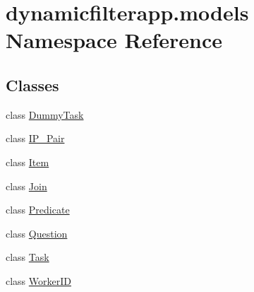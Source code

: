 \hypertarget{namespacedynamicfilterapp_1_1models}{}\section{dynamicfilterapp.\+models Namespace Reference}
\label{namespacedynamicfilterapp_1_1models}
\subsection*{Classes}
\begin{DoxyCompactItemize}
\item 
class \mbox{\hyperlink{classdynamicfilterapp_1_1models_1_1_dummy_task}{Dummy\+Task}}
\item 
class \mbox{\hyperlink{classdynamicfilterapp_1_1models_1_1_i_p___pair}{I\+P\+\_\+\+Pair}}
\item 
class \mbox{\hyperlink{classdynamicfilterapp_1_1models_1_1_item}{Item}}
\item 
class \mbox{\hyperlink{classdynamicfilterapp_1_1models_1_1_join}{Join}}
\item 
class \mbox{\hyperlink{classdynamicfilterapp_1_1models_1_1_predicate}{Predicate}}
\item 
class \mbox{\hyperlink{classdynamicfilterapp_1_1models_1_1_question}{Question}}
\item 
class \mbox{\hyperlink{classdynamicfilterapp_1_1models_1_1_task}{Task}}
\item 
class \mbox{\hyperlink{classdynamicfilterapp_1_1models_1_1_worker_i_d}{Worker\+ID}}
\end{DoxyCompactItemize}
